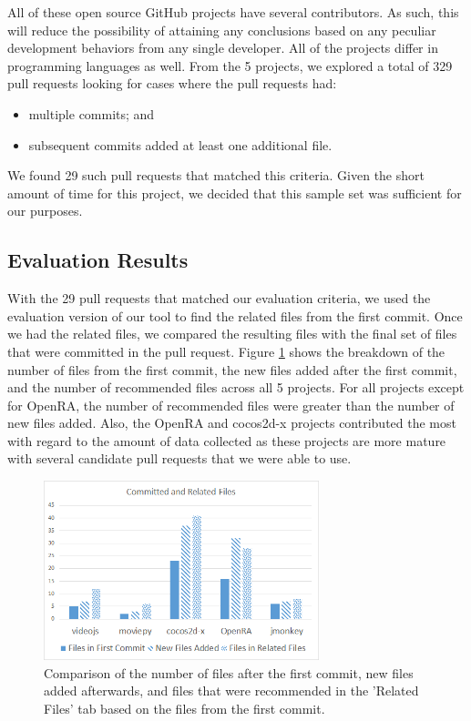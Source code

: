 All of these open source GitHub projects have several contributors. As such, this will reduce the possibility of attaining any conclusions based on any peculiar development behaviors from any single developer. All of the projects differ in programming languages as well. From the 5 projects, we explored a total of 329 pull requests looking for cases where the pull requests had: 

\begin{itemize}
  \item multiple commits; and
  \item subsequent commits added at least one additional file.
\end{itemize}

We found 29 such pull requests that matched this criteria. Given the short amount of time for this project, we decided that this sample set was sufficient for our purposes.

\subsection{Evaluation Results}

With the 29 pull requests that matched our evaluation criteria, we used the evaluation version of our tool to find the related files from the first commit. Once we had the related files, we compared the resulting files with the final set of files that were committed in the pull request. Figure \ref{fig:committedAndRelatedFiles} shows the breakdown of the number of files from the first commit, the new files added after the first commit, and the number of recommended files across all 5 projects. For all projects except for OpenRA, the number of recommended files were greater than the number of new files added. Also, the OpenRA and cocos2d-x projects contributed the most with regard to the amount of data collected as these projects are more mature with several candidate pull requests that we were able to use.

\begin{figure}[h!]
\includegraphics[width=8cm]{CommittedAndRelatedFiles}
\caption{Comparison of the number of files after the first commit, new files added afterwards, and files that were recommended in the 'Related Files' tab based on the files from the first commit.}
\label{fig:committedAndRelatedFiles}
\end{figure}

